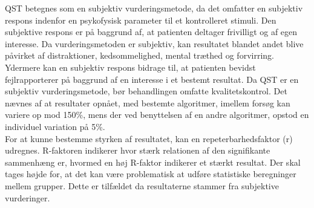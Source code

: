 QST betegnes som en subjektiv vurderingsmetode, da det omfatter en subjektiv respons indenfor en psykofysisk parameter til et kontrolleret stimuli. Den subjektive respons er på baggrund af, at patienten deltager frivilligt og af egen interesse. \citep{Mucke2016} Da vurderingsmetoden er subjektiv, kan resultatet blandet andet blive påvirket af distraktioner, kedsommelighed, mental træthed og forvirring. Ydermere kan en subjektiv respons bidrage til, at patienten bevidst fejlrapporterer på baggrund af en interesse i et bestemt resultat. \citep{Yarnitsky2006} Da QST er en subjektiv vurderingsmetode, bør behandlingen omfatte kvalitetskontrol. Det nævnes af  at resultater opnået, med bestemte algoritmer, imellem forsøg kan variere op mod 150\%, mens der ved benyttelsen af en andre algoritmer, opstod en individuel variation på 5\%. \\
For at kunne bestemme styrken af resultatet, kan en repeterbarhedsfaktor (r) udregnes. R-faktoren indikerer hvor stærk relationen af den signifikante sammenhæng er, hvormed en høj R-faktor indikerer et stærkt resultat. Der skal  tages højde for, at det kan være problematisk at udføre statistiske beregninger mellem grupper. Dette er tilfældet da resultaterne stammer fra subjektive vurderinger. \citep{Zaslansky1998} 

